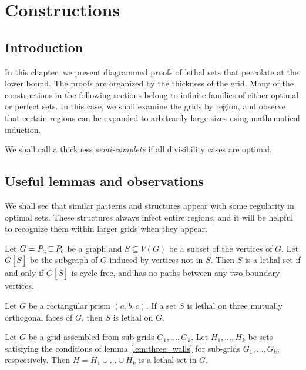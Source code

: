 \chapter{Constructions}

\section{Introduction}

In this chapter, we present diagrammed proofs of lethal sets that percolate at the lower bound. The proofs are organized by the thickness of the grid. Many of the constructions in the following sections belong to infinite families of either optimal or perfect sets. In this case, we shall examine the grids by region, and observe that certain regions can be expanded to arbitrarily large sizes using mathematical induction. 

We shall call a thickness \emph{semi-complete} if all divisibility cases are optimal.

\section{Useful lemmas and observations}

We shall see that similar patterns and structures appear with some regularity in optimal sets. These structures always infect entire regions, and it will be helpful to recognize them within larger grids when they appear. 

\begin{lem}
\label{lem:forest}
Let $G = P_a \Osq P_b$ be a graph and $S \subseteq V(G)$ be a subset of the vertices of $G$. Let $G[\overline{S}]$ be the subgraph of $G$ induced by vertices not in $S$. Then $S$ is a lethal set if and only if $G[\overline{S}]$ is cycle-free, and has no paths between any two boundary vertices. 
\end{lem}

\begin{lem}
\label{lem:three_walls}
Let $G$ be a rectangular prism $(a,b,c)$. If a set $S$ is lethal on three mutually orthogonal faces of $G$, then $S$ is lethal on $G$.
\end{lem}

\begin{cor}
\label{cor:three_walls}
Let $G$ be a grid assembled from sub-grids $G_1, \dots, G_k$. Let $H_1, \dots, H_k$ be sets satisfying the conditions of lemma \ref{lem:three_walls} for sub-grids $G_1, \dots, G_k$, respectively. Then $H = H_1 \cup \dots \cup H_k$ is a lethal set in $G$.
\end{cor}

